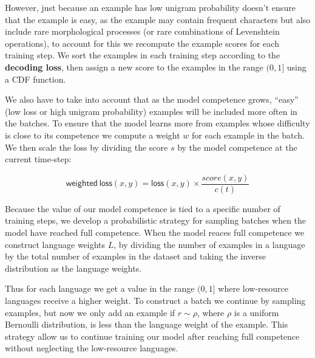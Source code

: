 \documentclass[11pt,a4paper]{article}
\newcommand\jp[1]{\textbf{JP: #1}}
\begin{document}
However, just because an example has low unigram probability doesn't
ensure that the example is easy, as the example may contain frequent
characters but also include rare morphological processes (or rare
combinations of Levenshtein operations), to account for this we
recompute the example scores for each training step. We sort the
examples in each training step according to the \textbf{decoding
loss}, then assign a new score to the examples in the range
$(0, 1]$ using a CDF function.

We also have to take into account that as the model competence grows,
``easy'' (low loss or high unigram probability) examples will be
included more often in the batches. To ensure that the model learns
more from examples whose difficulty is close to its competence we
compute a weight $w$ for each example in the batch. We then scale the
loss by dividing the score $s$ by the model competence at the current
time-step:

\begin{equation}
\mathsf{weighted\ loss}(x, y) = \mathsf{loss}(x, y) \times \frac{score(x, y)}{c(t)}
\end{equation}

Because the value of our model competence is tied to a specific number
of training steps, we develop a probabilistic strategy for sampling
batches when the model have reached full competence. 
When the model reaces full competence we construct language weights
$L$, by dividing the number of examples in a language by the total
number of examples in the dataset and taking the inverse distribution
as the language weights.

Thus for each language we get a value in the range $(0,1]$ where
low-resource languages receive a higher weight.  To construct a batch
we continue by sampling examples, but now we only add an example if
$r \sim \rho$, where $\rho$ is a uniform Bernoulli distribution, is
less than the language weight of the example.  This strategy allow us
to continue training our model after reaching full competence without
neglecting the low-resource languages.





\end{document}
